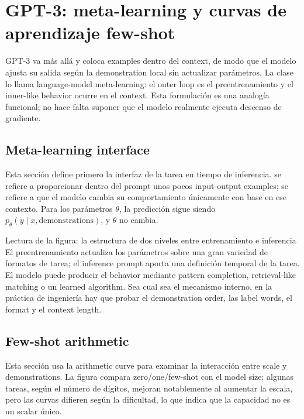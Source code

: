 \section{GPT-3: meta-learning y curvas de aprendizaje few-shot}

GPT-3 va más allá y coloca examples dentro del context, de modo que el modelo ajusta su salida según la demonstration local sin actualizar parámetros. La clase lo llama language-model meta-learning: el outer loop es el preentrenamiento y el inner-like behavior ocurre en el context. Esta formulación es una analogía funcional; no hace falta suponer que el modelo realmente ejecuta descenso de gradiente.

\subsection{Meta-learning interface}

Esta sección define primero la interfaz de la tarea en tiempo de inferencia.  se refiere a proporcionar dentro del prompt unos pocos input-output examples;  se refiere a que el modelo cambia su comportamiento únicamente con base en ese contexto. Para los parámetros $\theta$, la predicción sigue siendo $p_\theta(y\mid x,\text{demonstrations})$, y $\theta$ no cambia.


\begin{knowledgebox}{Lectura de la figura: la estructura de dos niveles entre entrenamiento e inferencia}
El preentrenamiento actualiza los parámetros sobre una gran variedad de formatos de tarea; el inference prompt aporta una definición temporal de la tarea. El modelo puede producir el behavior mediante pattern completion, retrieval-like matching o un learned algorithm. Sea cual sea el mecanismo interno, en la práctica de ingeniería hay que probar el demonstration order, las label words, el format y el context length.
\end{knowledgebox}

\subsection{Few-shot arithmetic}

Esta sección usa la arithmetic curve para examinar la interacción entre scale y demonstrations. La figura compara zero/one/few-shot con el model size; algunas tareas, según el número de dígitos, mejoran notablemente al aumentar la escala, pero las curvas difieren según la dificultad, lo que indica que la capacidad no es un scalar único.

